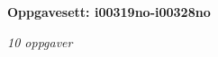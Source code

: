 \centerline{\bf Oppgavesett: i00319no-i00328no}
\vskip 10pt
\centerline{\it 10 oppgaver}\vskip 10pt
\vskip 10pt
